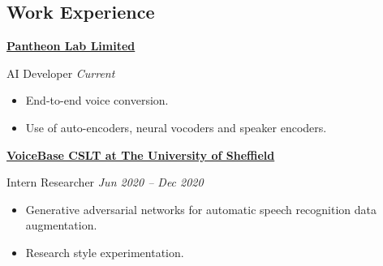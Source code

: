 \documentclass[10pt]{article} %
\begin{document}
\begin{changemargin}{0pt}{0.5pt} %

\begin{minipage}[t]{0.5\textwidth} %
\vspace{0pt} %


\section{Work Experience}

\begin{changemargin}{5pt}{5pt}

\vspace{5pt}
\underline{\textbf{Pantheon Lab Limited}}\\
\par
\vspace{-10pt}
AI Developer \hfill \textit{Current}\\
\vspace{-10pt}

\begin{itemize} \itemsep-2pt %
	\item End-to-end voice conversion.
	\item Use of auto-encoders, neural vocoders  and speaker encoders.
\end{itemize}
	

\vspace{5pt}
\underline{\textbf{VoiceBase CSLT at The University of Sheffield}}\\
\par
\vspace{-10pt}
Intern Researcher \hfill \textit{Jun 2020 -- Dec 2020}\\
\vspace{-10pt}

\begin{itemize} \itemsep-2pt %
  \item Generative adversarial networks for automatic speech recognition data augmentation.
  \item Research style experimentation.
\end{itemize}


\end{changemargin}
\end{minipage}
\end{changemargin}
\end{document}
